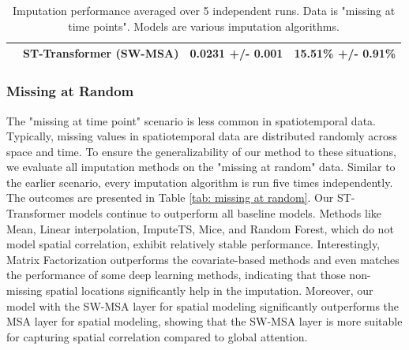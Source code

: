 \documentclass[11pt]{article}
\begin{document}
\begin{table}[h!]
\begin{tabularx}{\textwidth}{llXX}
        &\textbf{ST-Transformer (SW-MSA)} & 0.0231 +/- 0.001 & 15.51\% +/- 0.91\%\\
        \bottomrule
        

    \end{tabularx}
    \caption{Imputation performance averaged over 5 independent runs. Data is "missing at time points". Models are various imputation algorithms.}
    \label{tab: missing at time points}
\end{table}






\subsubsection*{Missing at Random}
The "missing at time point" scenario is less common in spatiotemporal data. Typically, missing values in spatiotemporal data are distributed randomly across space and time. To ensure the generalizability of our method to these situations, we evaluate all imputation methods on the "missing at random" data. Similar to the earlier scenario, every imputation algorithm is run five times independently. The outcomes are presented in Table \ref{tab: missing at random}. Our ST-Transformer models continue to outperform all baseline models. Methods like Mean, Linear interpolation, ImputeTS, Mice, and Random Forest, which do not model spatial correlation, exhibit relatively stable performance. Interestingly, Matrix Factorization outperforms the covariate-based methods and even matches the performance of some deep learning methods, indicating that those non-missing spatial locations significantly help in the imputation. Moreover, our model with the SW-MSA layer for spatial modeling significantly outperforms the MSA layer for spatial modeling, showing that the SW-MSA layer is more suitable for capturing spatial correlation compared to global attention.
\end{document}
